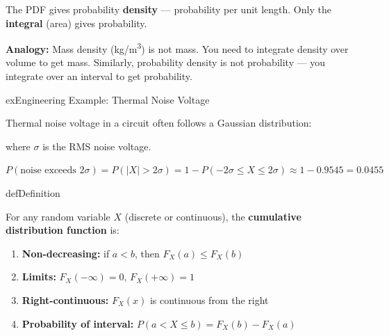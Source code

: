 The PDF gives probability \textbf{density} — probability per unit length. Only the \textbf{integral} (area) gives probability.

\textbf{Analogy:} Mass density (kg/m\textsuperscript{3}) is not mass. You need to integrate density over volume to get mass. Similarly, probability density is not probability — you integrate over an interval to get probability.



\begin{PSbox}[unbreakable]{ex}{Engineering Example: Thermal Noise Voltage}

Thermal noise voltage in a circuit often follows a Gaussian distribution:


where $\sigma$ is the RMS noise voltage.

$P(\text{noise exceeds 2}\sigma) = P(\lvert X\rvert > 2\sigma) = 1 - P(-2\sigma \le X \le 2\sigma) \approx 1 - 0.9545 = 0.0455$

\end{PSbox}


\begin{PSbox}[unbreakable]{def}{Definition}

For any random variable $X$ (discrete or continuous), the \textbf{cumulative distribution function} is:


\end{PSbox}


\begin{enumerate}
\def\labelenumi{\arabic{enumi}.}
\tightlist
\item
  \textbf{Non-decreasing:} if $a < b$, then $F_{X}(a) \le F_{X}(b)$
\item
  \textbf{Limits:} $F_{X}(-\infty) = 0,\, F_{X}(+\infty) = 1$
\item
  \textbf{Right-continuous:} $F_{X}(x)$ is continuous from the right
\item
  \textbf{Probability of interval:} $P(a < X \le b) = F_{X}(b) - F_{X}(a)$
\end{enumerate}


